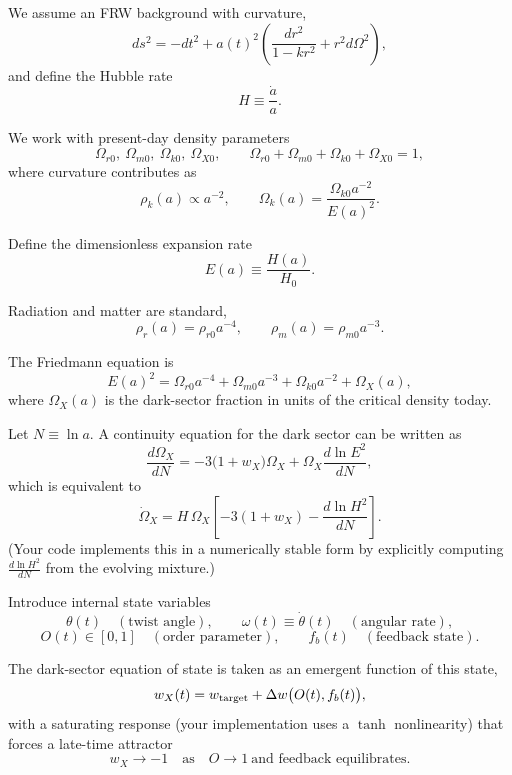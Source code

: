 \documentclass[11pt]{article}
\begin{document}
We assume an FRW background with curvature,
\[
ds^2 = -dt^2 + a(t)^2\left(\frac{dr^2}{1-k r^2}+r^2 d\Omega^2\right),
\]
and define the Hubble rate
\[
H \equiv \frac{\dot a}{a}.
\]

We work with present-day density parameters
\[
\Omega_{r0},\ \Omega_{m0},\ \Omega_{k0},\ \Omega_{X0},
\qquad
\Omega_{r0}+\Omega_{m0}+\Omega_{k0}+\Omega_{X0}=1,
\]
where curvature contributes as
\[
\rho_k(a) \propto a^{-2},
\qquad
\Omega_k(a)=\frac{\Omega_{k0}a^{-2}}{E(a)^2}.
\]

Define the dimensionless expansion rate
\[
E(a)\equiv \frac{H(a)}{H_0}.
\]

Radiation and matter are standard,
\[
\rho_r(a)=\rho_{r0}a^{-4},
\qquad
\rho_m(a)=\rho_{m0}a^{-3}.
\]

The Friedmann equation is
\[
E(a)^2
=
\Omega_{r0}a^{-4}
+\Omega_{m0}a^{-3}
+\Omega_{k0}a^{-2}
+\Omega_X(a),
\]
where \(\Omega_X(a)\) is the dark-sector fraction in units of the critical density today.

Let \(N\equiv \ln a\). A continuity equation for the dark sector can be written as
\[
\frac{d\Omega_X}{dN}
=
-3\bigl(1+w_X\bigr)\Omega_X
+\Omega_X\frac{d\ln E^2}{dN},
\]
which is equivalent to
\[
\dot\Omega_X
=
H\,\Omega_X\left[-3(1+w_X)-\frac{d\ln H^2}{dN}\right].
\]
(Your code implements this in a numerically stable form by explicitly computing
\(\frac{d\ln H^2}{dN}\) from the evolving mixture.)

Introduce internal state variables
\[
\theta(t) \quad (\text{twist angle}),\qquad
\omega(t)\equiv \dot\theta(t)\quad (\text{angular rate}),
\]
\[
O(t)\in[0,1]\quad(\text{order parameter}),\qquad
f_b(t)\quad(\text{feedback state}).
\]

The dark-sector equation of state is taken as an emergent function of this state,
\[
w_X(t) = w_{\rm target} + \Delta w\bigl(O(t), f_b(t)\bigr),
\]
with a saturating response (your implementation uses a \(\tanh\) nonlinearity)
that forces a late-time attractor
\[
w_X \to -1 \quad \text{as}\quad O\to 1\ \text{and feedback equilibrates.}
\]
\end{document}
